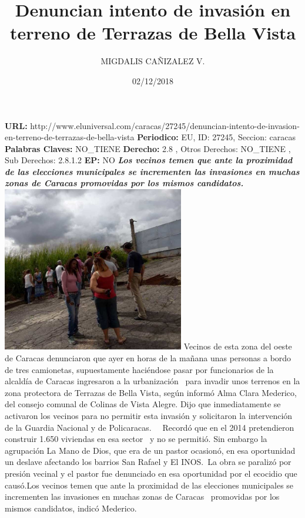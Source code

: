 \documentclass{article}%
\title{\textbf{Denuncian intento de invasión en terreno de Terrazas de Bella Vista}}%
\author{MIGDALIS CAÑIZALEZ V.}%
\date{02/12/2018}%
\begin{document}
%
\normalsize%
\maketitle%
\textbf{URL: }%
http://www.eluniversal.com/caracas/27245/denuncian{-}intento{-}de{-}invasion{-}en{-}terreno{-}de{-}terrazas{-}de{-}bella{-}vista\newline%
%
\textbf{Periodico: }%
EU, %
ID: %
27245, %
Seccion: %
caracas\newline%
%
\textbf{Palabras Claves: }%
NO\_TIENE\newline%
%
\textbf{Derecho: }%
2.8%
, Otros Derechos: %
NO\_TIENE%
, Sub Derechos: %
2.8.1.2%
\newline%
%
\textbf{EP: }%
NO\newline%
\newline%
%
\textbf{\textit{Los vecinos temen que ante la proximidad de las elecciones municipales se incrementen las invasiones en muchas zonas de Caracas  promovidas por los mismos candidatos.}}%
\newline%
\newline%
%
\includegraphics[width=300px]{260.jpg}%
\newline%
%
Vecinos de esta zona del oeste de Caracas denunciaron que ayer en horas de la mañana unas personas a bordo de tres camionetas, supuestamente haciéndose pasar por funcionarios de la alcaldía de Caracas ingresaron a la urbanización~ para invadir unos terrenos en la zona protectora de Terrazas de Bella Vista,  según informó Alma Clara Mederico, del consejo comunal de Colinas de Vista Alegre.%
\newline%
%
Dijo que inmediatamente se activaron los vecinos para no permitir esta invasión y solicitaron la intervención de la Guardia Nacional y de Policaracas.~ ~Recordó que  en el 2014 pretendieron construir 1.650 viviendas en esa sector~ y no se permitió. Sin embargo la agrupación La Mano de Dios, que era de un pastor ocasionó, en esa oportunidad~ un deslave afectando los barrios San Rafael y El INOS.~La obra se paralizó por presión vecinal y el pastor fue denunciado en esa oportunidad por el ecocidio que causó.Los vecinos temen que ante la proximidad de las elecciones municipales se incrementen las invasiones en muchas zonas de Caracas~ promovidas por los mismos candidatos, indicó Mederico.%
\newline%
%
\end{document}
